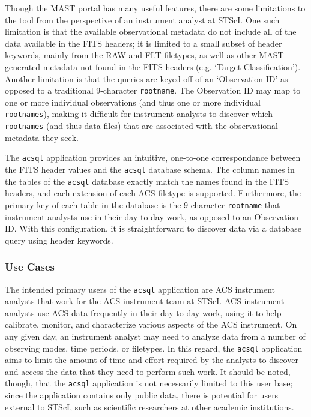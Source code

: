 \documentclass[10pt,journal,compsoc]{IEEEtran}
\begin{document}
Though the MAST portal has many useful features, there are some limitations to the tool from the perspective of an instrument analyst at STScI.  One such limitation is that
the available observational metadata do not include all of the data available in the FITS headers; it is limited to a small subset of header keywords, mainly
from the RAW and FLT filetypes, as well as other MAST-generated metadata not found in the FITS headers (e.g. `Target Classification').  Another limitation is that the queries are
keyed off of an `Observation ID' as opposed to a traditional 9-character \texttt{rootname}.  The Observation ID may map to one or more individual observations (and thus one or more
individual \texttt{rootnames}), making it difficult for instrument analysts to discover which \texttt{rootnames} (and thus data files) that are associated with the observational
metadata they seek.

The \texttt{acsql} application provides an intuitive, one-to-one correspondance between the FITS header values and the \texttt{acsql} database schema.  The column names in the
tables of the \texttt{acsql} database exactly match the names found in the FITS headers, and each extension of each ACS filetype is supported.  Furthermore, the primary key of each
table in the database is the 9-character \texttt{rootname} that instrument analysts use in their day-to-day work, as opposed to an Observation ID.  With this configuration, it
is straightforward to discover data via a database query using header keywords.


\subsubsection{Use Cases} \label{sec1.3.5}

The intended primary users of the \texttt{acsql} application are ACS instrument analysts that work for the ACS instrument team at STScI.  ACS instrument analysts use ACS data frequently
in their day-to-day work, using it to help calibrate, monitor, and characterize various aspects of the ACS instrument.  On any given day, an instrument analyst may need to analyze
data from a number of observing modes, time periods, or filetypes.  In this regard, the \texttt{acsql} application aims to limit the amount of time and effort required by the
analysts to discover and access the data that they need to perform such work. It should be noted, though, that the \texttt{acsql} application is not necessarily limited to this user base;
since the application contains only public data, there is potential for users external to STScI, such as scientific researchers at other academic institutions.
\end{document}
